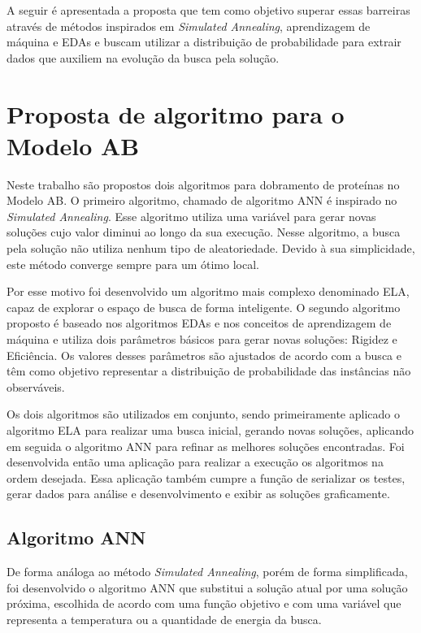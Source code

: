 \documentclass[dm,ppgcomp]{texfurg}
\begin{document}
A seguir é apresentada a proposta que tem como objetivo superar essas barreiras através de métodos inspirados em {\it Simulated Annealing}, aprendizagem de máquina e EDAs e buscam utilizar a distribuição de probabilidade para extrair dados que auxiliem na evolução da busca pela solução.

\chapter{Proposta de algoritmo para o Modelo AB}

Neste trabalho são propostos dois algoritmos para dobramento de proteínas no Modelo AB. O primeiro algoritmo, chamado de algoritmo ANN é inspirado no {\it Simulated Annealing}. Esse algoritmo utiliza uma variável para gerar novas soluções cujo valor diminui ao longo da sua execução. Nesse algoritmo, a busca pela solução não utiliza nenhum tipo de aleatoriedade. Devido à sua simplicidade, este método converge sempre para um ótimo local. 

Por esse motivo foi desenvolvido um algoritmo mais complexo denominado ELA, capaz de explorar o espaço de busca de forma inteligente. O segundo algoritmo proposto é baseado nos algoritmos EDAs e nos conceitos de aprendizagem de máquina e utiliza dois parâmetros básicos para gerar novas soluções: Rigidez e Eficiência. Os valores desses parâmetros são ajustados de acordo com a busca e têm como objetivo representar a distribuição de probabilidade das instâncias não observáveis.

Os dois algoritmos são utilizados em conjunto, sendo primeiramente aplicado o algoritmo ELA para realizar uma busca inicial, gerando novas soluções, aplicando em seguida o algoritmo ANN para refinar as melhores soluções encontradas. Foi desenvolvida então uma aplicação para realizar a execução os algoritmos na ordem desejada. Essa aplicação também cumpre a função de serializar os testes, gerar dados para análise e desenvolvimento e exibir as soluções graficamente. 

\section{Algoritmo ANN}

De forma análoga ao método {\it Simulated Annealing}, porém de forma simplificada, foi desenvolvido o algoritmo ANN que substitui a solução atual por uma solução próxima, escolhida de acordo com uma função objetivo e com uma variável que representa a temperatura ou a quantidade de energia da busca. 
\end{document}
